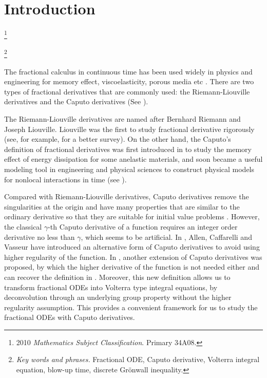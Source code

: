 \documentclass[12pt]{amsart}%
\theoremstyle{definition}
\theoremstyle{remark}
\newcommand\blfootnote[1]{%
  \begingroup
  \renewcommand\thefootnote{}\footnote{#1}%
  \addtocounter{footnote}{-1}%
  \endgroup
}
\begin{document}
\maketitle

\section{Introduction}
\blfootnote{2010 {\it Mathematics Subject Classification}. Primary 34A08.} \blfootnote{{\it Key words and phrases.} Fractional ODE, Caputo derivative, Volterra integral equation, blow-up time, discrete Gr\"{o}nwall inequality.}
The fractional calculus in continuous time has been used widely in physics and engineering for memory effect, viscoelasticity, porous media etc \cite{gm97, df02, kst06,mpg07,diethelm10, ala16, taylorremarks}. There are two types of fractional derivatives that are commonly used: the Riemann-Liouville derivatives and the Caputo derivatives (See \cite{kst06}). 

The Riemann-Liouville derivatives are named after Bernhard Riemann and Joseph Liouville. Liouville was the first to study fractional derivative rigorously (see, for example, \cite{munkhammar2004riemann,drapaca2012fractional} for a better survey). On the other hand, the Caputo's definition of fractional derivatives was first introduced in \cite{caputo1967linear} to study the memory effect of energy dissipation for some anelastic materials, and soon became a useful modeling tool  in engineering and physical sciences to construct physical models for nonlocal interactions in time (see \cite{zaslavsky2002chaos}). 

Compared with Riemann-Liouville derivatives, Caputo derivatives remove the singularities at the origin and have many properties that are similar to the ordinary derivative so that they are suitable for initial value problems \cite{liliu16}. However, the classical $\gamma$-th Caputo derivative of a function requires an integer order derivative no less than $\gamma$, which seems to be artificial. In \cite{ala16}, Allen, Caffarelli and Vasseur have introduced an alternative form of Caputo derivatives to avoid using higher regularity of the function. In \cite{liliu16}, another extension of Caputo derivatives was proposed, by which the higher derivative of the function is not needed either and can recover the definition in \cite{ala16}. Moreover, this new definition allows us to transform fractional ODEs into Volterra type integral equations,  by deconvolution through an underlying group property without the higher regularity assumption. This provides a convenient framework for us to study the fractional ODEs with Caputo derivatives. 
\end{document}
